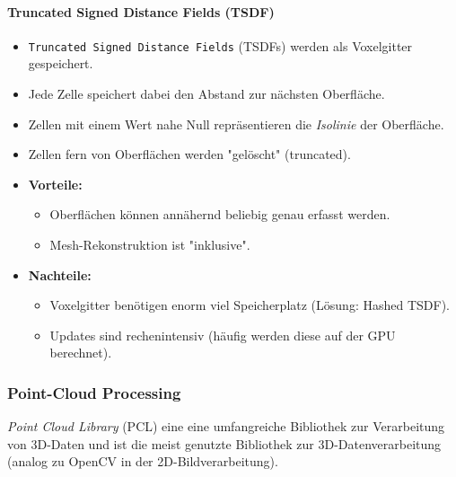 				\paragraph{Truncated Signed Distance Fields (TSDF)}
					\begin{itemize}
						\item \texttt{Truncated Signed Distance Fields} (TSDFs) werden als Voxelgitter gespeichert.
						\item Jede Zelle speichert dabei den Abstand zur nächsten Oberfläche.
						\item Zellen mit einem Wert nahe Null repräsentieren die \emph{Isolinie} der Oberfläche.
						\item Zellen fern von Oberflächen werden "gelöscht" (truncated).
						\item \textbf{Vorteile:}
							\begin{itemize}
								\item Oberflächen können annähernd beliebig genau erfasst werden.
								\item Mesh-Rekonstruktion ist "inklusive".
							\end{itemize}
						\item \textbf{Nachteile:}
							\begin{itemize}
								\item Voxelgitter benötigen enorm viel Speicherplatz (Lösung: Hashed TSDF).
								\item Updates sind rechenintensiv (häufig werden diese auf der GPU berechnet).
							\end{itemize}
					\end{itemize}

			\subsubsection{Point-Cloud Processing}
				\emph{Point Cloud Library} (PCL) eine eine umfangreiche Bibliothek zur Verarbeitung von 3D-Daten und ist die meist genutzte Bibliothek zur 3D-Datenverarbeitung (analog zu OpenCV in der 2D-Bildverarbeitung).
				
